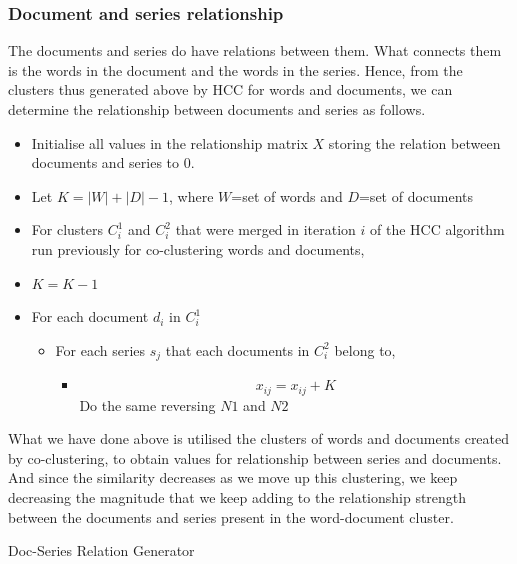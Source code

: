 \documentclass[11pt,twocolumn]{article}
\begin{document}
\subsubsection{Document and series relationship}
The documents and series do have relations between them. What connects them is the words in the document and the words in the series. Hence, from the clusters thus generated above by HCC for words and documents, we can determine the relationship between documents and series as follows.
\begin{itemize}
\item
  Initialise all values in the relationship matrix $X$ storing the relation between documents and series to $0$.
\item
  Let $K=|W|+|D|-1$, where $W$=set of words and $D$=set of documents
\item
  For clusters $C^1_i$ and $C^2_i$ that were merged in iteration $i$ of the HCC algorithm run previously for co-clustering words and documents,
\item
  $K=K-1$
\item
  For each document $d_i$ in $C^1_i$
  \begin{itemize}
  \item
    For each series $s_j$ that each documents in $C^2_i$ belong to,
    \begin{itemize}
    \item
      \begin{displaymath}
        x_{ij}=x_{ij}+K
      \end{displaymath}
      Do the same reversing $N1$ and $N2$
    \end{itemize}
  \end{itemize}
\end{itemize}
What we have done above is utilised the clusters of words and documents created by co-clustering, to obtain values for relationship between series and documents. And since the similarity decreases as we move up this clustering, we keep decreasing the magnitude that we keep adding to the relationship strength between the documents and series present in the word-document cluster.

\begin{algorithm}[H]
  \caption{Doc-Series Relation Generator}
  \label{doc_series}
  \begin{algorithmic}
    \ENDFOR
  \end{algorithmic}
\end{algorithm}
\end{document}
